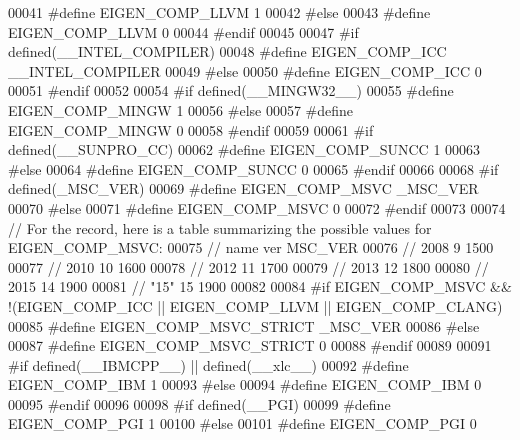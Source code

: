 \begin{DoxyCode}
00041 \textcolor{preprocessor}{  #define EIGEN\_COMP\_LLVM 1}
00042 \textcolor{preprocessor}{#else}
00043 \textcolor{preprocessor}{  #define EIGEN\_COMP\_LLVM 0}
00044 \textcolor{preprocessor}{#endif}
00045 
00047 \textcolor{preprocessor}{#if defined(\_\_INTEL\_COMPILER)}
00048 \textcolor{preprocessor}{  #define EIGEN\_COMP\_ICC \_\_INTEL\_COMPILER}
00049 \textcolor{preprocessor}{#else}
00050 \textcolor{preprocessor}{  #define EIGEN\_COMP\_ICC 0}
00051 \textcolor{preprocessor}{#endif}
00052 
00054 \textcolor{preprocessor}{#if defined(\_\_MINGW32\_\_)}
00055 \textcolor{preprocessor}{  #define EIGEN\_COMP\_MINGW 1}
00056 \textcolor{preprocessor}{#else}
00057 \textcolor{preprocessor}{  #define EIGEN\_COMP\_MINGW 0}
00058 \textcolor{preprocessor}{#endif}
00059 
00061 \textcolor{preprocessor}{#if defined(\_\_SUNPRO\_CC)}
00062 \textcolor{preprocessor}{  #define EIGEN\_COMP\_SUNCC 1}
00063 \textcolor{preprocessor}{#else}
00064 \textcolor{preprocessor}{  #define EIGEN\_COMP\_SUNCC 0}
00065 \textcolor{preprocessor}{#endif}
00066 
00068 \textcolor{preprocessor}{#if defined(\_MSC\_VER)}
00069 \textcolor{preprocessor}{  #define EIGEN\_COMP\_MSVC \_MSC\_VER}
00070 \textcolor{preprocessor}{#else}
00071 \textcolor{preprocessor}{  #define EIGEN\_COMP\_MSVC 0}
00072 \textcolor{preprocessor}{#endif}
00073 
00074 \textcolor{comment}{// For the record, here is a table summarizing the possible values for EIGEN\_COMP\_MSVC:}
00075 \textcolor{comment}{//  name  ver   MSC\_VER}
00076 \textcolor{comment}{//  2008    9      1500}
00077 \textcolor{comment}{//  2010   10      1600}
00078 \textcolor{comment}{//  2012   11      1700}
00079 \textcolor{comment}{//  2013   12      1800}
00080 \textcolor{comment}{//  2015   14      1900}
00081 \textcolor{comment}{//  "15"   15      1900}
00082 
00084 \textcolor{preprocessor}{#if EIGEN\_COMP\_MSVC && !(EIGEN\_COMP\_ICC || EIGEN\_COMP\_LLVM || EIGEN\_COMP\_CLANG)}
00085 \textcolor{preprocessor}{  #define EIGEN\_COMP\_MSVC\_STRICT \_MSC\_VER}
00086 \textcolor{preprocessor}{#else}
00087 \textcolor{preprocessor}{  #define EIGEN\_COMP\_MSVC\_STRICT 0}
00088 \textcolor{preprocessor}{#endif}
00089 
00091 \textcolor{preprocessor}{#if defined(\_\_IBMCPP\_\_) || defined(\_\_xlc\_\_)}
00092 \textcolor{preprocessor}{  #define EIGEN\_COMP\_IBM 1}
00093 \textcolor{preprocessor}{#else}
00094 \textcolor{preprocessor}{  #define EIGEN\_COMP\_IBM 0}
00095 \textcolor{preprocessor}{#endif}
00096 
00098 \textcolor{preprocessor}{#if defined(\_\_PGI)}
00099 \textcolor{preprocessor}{  #define EIGEN\_COMP\_PGI 1}
00100 \textcolor{preprocessor}{#else}
00101 \textcolor{preprocessor}{  #define EIGEN\_COMP\_PGI 0}

\end{DoxyCode}
